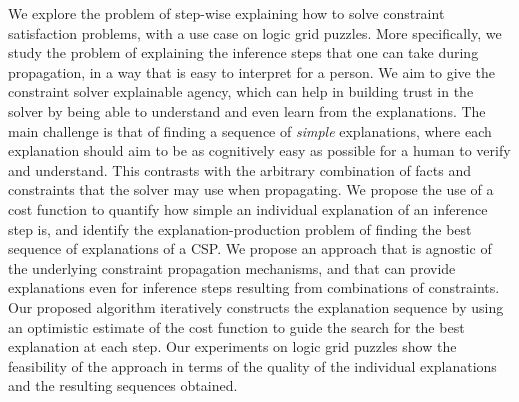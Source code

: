 We explore the problem of step-wise explaining how to solve constraint satisfaction problems, with a use case on logic grid puzzles.
More specifically, we study the problem of explaining the inference steps that one can take during propagation, in a way that is easy to interpret for a person.
We aim to give the constraint solver explainable agency, which can help in building trust in the solver by being able to understand and even learn from the explanations.
The main challenge is that of finding a sequence of \textit{simple} explanations, where each explanation should aim to be as cognitively easy as possible for a human to verify and understand. 
This contrasts with the arbitrary combination of facts and constraints that the solver may use when propagating.
We propose the use of a cost function to quantify how simple an individual explanation of an inference step is, and identify the explanation-production problem of finding the best sequence of explanations of a CSP. 
We propose an approach that is agnostic of the underlying constraint propagation mechanisms, and that can provide explanations even for inference steps resulting from combinations of constraints.
Our proposed algorithm iteratively constructs the explanation sequence by using an optimistic estimate of the cost function to guide the search for the best explanation at each step.
Our experiments on logic grid puzzles show the feasibility of the approach in terms of the quality of the individual explanations and the resulting sequences obtained.
